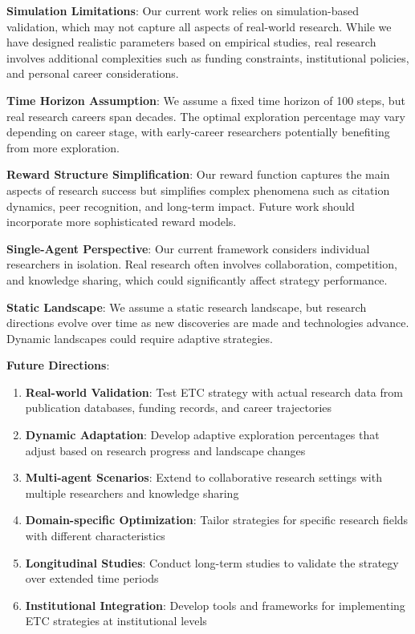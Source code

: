 \documentclass[letterpaper]{article} %
\begin{document}
\textbf{Simulation Limitations}: Our current work relies on simulation-based validation, which may not capture all aspects of real-world research. While we have designed realistic parameters based on empirical studies, real research involves additional complexities such as funding constraints, institutional policies, and personal career considerations.

\textbf{Time Horizon Assumption}: We assume a fixed time horizon of 100 steps, but real research careers span decades. The optimal exploration percentage may vary depending on career stage, with early-career researchers potentially benefiting from more exploration.

\textbf{Reward Structure Simplification}: Our reward function captures the main aspects of research success but simplifies complex phenomena such as citation dynamics, peer recognition, and long-term impact. Future work should incorporate more sophisticated reward models.

\textbf{Single-Agent Perspective}: Our current framework considers individual researchers in isolation. Real research often involves collaboration, competition, and knowledge sharing, which could significantly affect strategy performance.

\textbf{Static Landscape}: We assume a static research landscape, but research directions evolve over time as new discoveries are made and technologies advance. Dynamic landscapes could require adaptive strategies.

\textbf{Future Directions}:
\begin{enumerate}
\item \textbf{Real-world Validation}: Test ETC strategy with actual research data from publication databases, funding records, and career trajectories
\item \textbf{Dynamic Adaptation}: Develop adaptive exploration percentages that adjust based on research progress and landscape changes
\item \textbf{Multi-agent Scenarios}: Extend to collaborative research settings with multiple researchers and knowledge sharing
\item \textbf{Domain-specific Optimization}: Tailor strategies for specific research fields with different characteristics
\item \textbf{Longitudinal Studies}: Conduct long-term studies to validate the strategy over extended time periods
\item \textbf{Institutional Integration}: Develop tools and frameworks for implementing ETC strategies at institutional levels
\end{enumerate}
\end{document}
